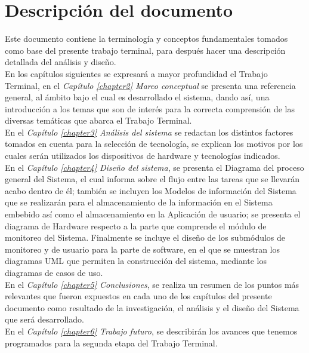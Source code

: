 \section{Descripción del documento}
Este documento contiene la terminología y conceptos fundamentales tomados como base del presente trabajo terminal, para después hacer una descripción detallada del análisis y diseño. 
\\
En los capítulos siguientes se expresará a mayor profundidad el Trabajo Terminal, en el \textit{Capítulo \ref{chapter2} Marco conceptual} se presenta una referencia general, al ámbito bajo el cual es desarrollado el sistema, dando así, una introducción a los temas que son de interés para la correcta comprensión de las diversas temáticas que abarca el Trabajo Terminal.
\\
En el \textit{Capítulo \ref{chapter3} Análisis del sistema} se redactan los distintos factores tomados en cuenta para la selección de tecnología, se explican los motivos por los cuales serán utilizados los dispositivos de hardware y tecnologías indicados.
\\
En el \textit{Capítulo \ref{chapter4} Diseño del sistema}, se presenta el Diagrama del proceso general del Sistema, el cual informa sobre el flujo entre las tareas que se llevarán acabo dentro de él; también se incluyen los Modelos de información del Sistema que se realizarán para el almacenamiento de la información en el Sistema embebido así como el almacenamiento en la Aplicación de usuario; se presenta el diagrama de Hardware respecto a la parte que comprende el módulo de monitoreo del Sistema. Finalmente se incluye el diseño de los submódulos de monitoreo y de usuario para la parte de software, en el que se muestran los diagramas UML que permiten la construcción del sistema, mediante los diagramas de casos de uso.
\\
En el \textit{Capítulo \ref{chapter5} Conclusiones}, 
se realiza un resumen de los puntos más relevantes que fueron expuestos en cada uno de los capítulos del presente documento como resultado de la investigación, el análisis y el diseño del Sistema que será desarrollado.   
\\
En el \textit{Capítulo \ref{chapter6} Trabajo futuro}, se describirán los avances que tenemos programados para la segunda etapa del Trabajo Terminal.

